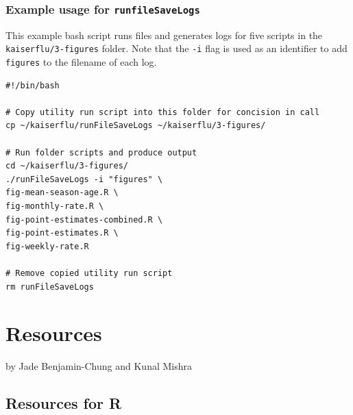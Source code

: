 \documentclass[]{book}
\begin{document}
\subsection{\texorpdfstring{Example usage for
\texttt{runfileSaveLogs}}{Example usage for runfileSaveLogs}}\label{example-usage-for-runfilesavelogs}

This example bash script runs files and generates logs for five scripts
in the \texttt{kaiserflu/3-figures} folder. Note that the \texttt{-i}
flag is used as an identifier to add \texttt{figures} to the filename of
each log.

\begin{verbatim}
#!/bin/bash

# Copy utility run script into this folder for concision in call
cp ~/kaiserflu/runFileSaveLogs ~/kaiserflu/3-figures/

# Run folder scripts and produce output
cd ~/kaiserflu/3-figures/
./runFileSaveLogs -i "figures" \
fig-mean-season-age.R \
fig-monthly-rate.R \
fig-point-estimates-combined.R \
fig-point-estimates.R \
fig-weekly-rate.R

# Remove copied utility run script
rm runFileSaveLogs
\end{verbatim}

\chapter{Resources}\label{resources}

by Jade Benjamin-Chung and Kunal Mishra

\section{Resources for R}\label{resources-for-r}
\end{document}
